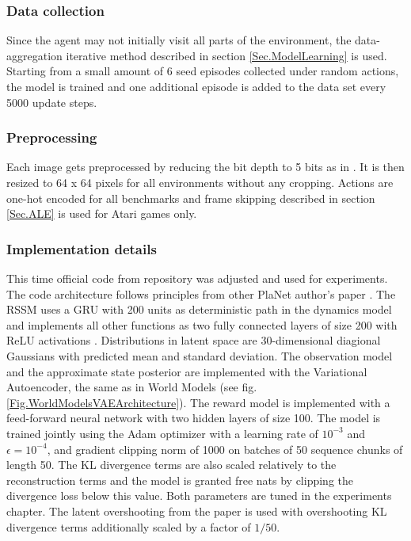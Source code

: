 \subsubsection{Data collection}

Since the agent may not initially visit all parts of the environment, the data-aggregation iterative method described in section \ref{Sec.ModelLearning} is used. Starting from a small amount of 6 seed episodes collected under random actions, the model is trained and one additional episode is added to the data set every 5000 update steps.

\subsubsection{Preprocessing}

Each image gets preprocessed by reducing the bit depth to 5 bits as in \cite{Algo.Glow5bit}. It is then resized to 64 x 64 pixels for all environments without any cropping.
Actions are one-hot encoded for all benchmarks and frame skipping described in section \ref{Sec.ALE} is used for Atari games only.

\subsubsection{Implementation details}

This time official code from repository \cite{Code.PlaNet} was adjusted and used for experiments. The code architecture follows principles from other PlaNet author's paper \cite{Code.TFAgents}.
The RSSM uses a GRU \cite{Algo.GRU} with 200 units as deterministic path in the dynamics model and implements all other functions as two fully connected layers of size 200 with ReLU activations \cite{Algo.ReLU}. Distributions in latent space are 30-dimensional diagional Gaussians with predicted mean and standard deviation.
The observation model and the approximate state posterior are implemented with the Variational Autoencoder, the same as in World Models (see fig.\ref{Fig.WorldModelsVAEArchitecture}). The reward model is implemented with a feed-forward neural network with two hidden layers of size 100.
The model is trained jointly using the Adam optimizer \cite{Algo.Adam} with a learning rate of $10^{-3}$ and $\epsilon = 10^{−4}$, and gradient clipping norm of 1000 on batches of 50 sequence chunks of length 50. The KL divergence terms are also scaled relatively to the reconstruction terms and the model is granted free nats by clipping the divergence loss below this value. Both parameters are tuned in the experiments chapter. The latent overshooting from the paper \cite{Algo.PlaNet} is used with overshooting KL divergence terms additionally scaled by a factor of $1/50$. 

